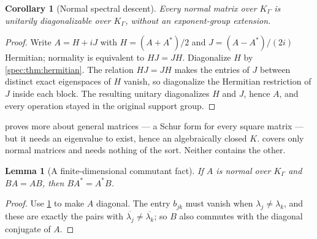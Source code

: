 \documentclass[11pt,a4paper]{article}
\numberwithin{equation}{section}
\newtheorem{lemma}[lemma]{Lemma}
\newtheorem{corollary}[corollary]{Corollary}
\theoremstyle{definition}
\theoremstyle{remark}
\begin{document}
\begin{corollary}[Normal spectral descent]\label{spec:cor:normal}
Every normal matrix over $K_\Gamma$ is unitarily diagonalizable over
$K_\Gamma$, without an exponent-group extension.
\end{corollary}
\begin{proof}
Write $A=H+iJ$ with $H=(A+A^*)/2$ and $J=(A-A^*)/(2i)$ Hermitian; normality
is equivalent to $HJ=JH$. Diagonalize $H$ by \cref{spec:thm:hermitian}. The
relation $HJ=JH$ makes the entries of $J$ between distinct exact eigenspaces
of $H$ vanish, so diagonalize the Hermitian restriction of $J$ inside each
block. The resulting unitary diagonalizes $H$ and $J$, hence $A$, and every
operation stayed in the original support group.
\end{proof}

 proves more about general matrices --- a Schur form for
every square matrix --- but it needs an eigenvalue to exist, hence an
algebraically closed $K$.  covers only normal matrices
and needs nothing of the sort. Neither contains the other.

\begin{lemma}[A finite-dimensional commutant fact]\label{spec:lem:commutant}
If $A$ is normal over $K_\Gamma$ and $BA=AB$, then $BA^*=A^*B$.
\end{lemma}
\begin{proof}
Use \cref{spec:cor:normal} to make $A$ diagonal. The entry $b_{jk}$ must
vanish when $\lambda_j\ne\lambda_k$, and these are exactly the pairs with
$\overline{\lambda_j}\ne\overline{\lambda_k}$; so $B$ also commutes with the
diagonal conjugate of $A$.
\end{proof}
\end{document}
